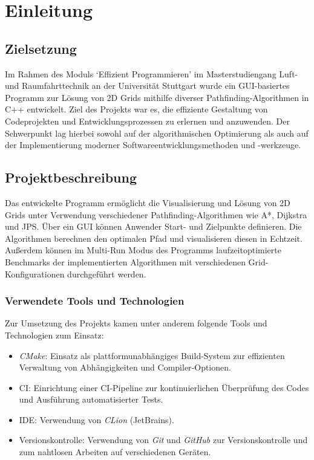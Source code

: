 \chapter{Einleitung}
\label{ch:einleitung}

\section{Zielsetzung}
\label{sec:motivation}
Im Rahmen des Moduls `Effizient Programmieren' im Masterstudiengang Luft- und Raumfahrttechnik an der Universität Stuttgart
wurde ein GUI-basiertes Programm zur Lösung von 2D Grids mithilfe diverser Pathfinding-Algorithmen in C++ entwickelt.
Ziel des Projekts war es, die effiziente Gestaltung von Codeprojekten und Entwicklungsprozessen zu erlernen und anzuwenden.
Der Schwerpunkt lag hierbei sowohl auf der algorithmischen Optimierung als auch auf der Implementierung moderner Softwareentwicklungsmethoden und -werkzeuge.

\section{Projektbeschreibung}
\label{sec:beschreibung}
Das entwickelte Programm ermöglicht die Visualisierung und Lösung von 2D Grids unter Verwendung verschiedener Pathfinding-Algorithmen wie A*, Dijkstra und \ac{JPS}.
Über ein \ac{GUI} können Anwender Start- und Zielpunkte definieren.
Die Algorithmen berechnen den optimalen Pfad und visualisieren diesen in Echtzeit.
Außerdem können im Multi-Run Modus des Programms laufzeitoptimierte Benchmarks der implementierten Algorithmen mit verschiedenen Grid-Konfigurationen durchgeführt werden.
\subsection*{Verwendete Tools und Technologien}
Zur Umsetzung des Projekts kamen unter anderem folgende Tools und Technologien zum Einsatz:
\begin{itemize}
\item \textit{CMake}: Einsatz als plattformunabhängiges Build-System zur effizienten Verwaltung von Abhängigkeiten und Compiler-Optionen.
\item \ac{CI}: Einrichtung einer CI-Pipeline zur kontinuierlichen Überprüfung des Codes und Ausführung automatisierter Tests.
\item \ac{IDE}: Verwendung von \textit{CLion} (JetBrains).
\item Versionskontrolle: Verwendung von \textit{Git} und \textit{GitHub} zur Versionskontrolle und zum nahtlosen Arbeiten auf verschiedenen Geräten.
\end{itemize}

